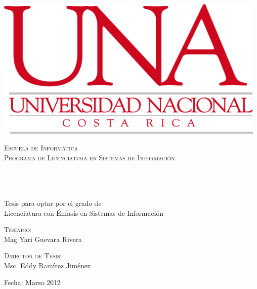 \begin{titlepage}
	\begin{center}
		\includegraphics[scale=0.5]{images/logoUNA.png}
	\end{center}
	\begin{center}	
	\textcolor{unablue}{%
		\textsc{\LARGE Escuela de Inform\'{a}tica}
		\\[0.2cm]
		\textsc{\large Programa de Licenciatura en Sistemas de
		Informaci\'{o}n}
		\\
	}
	\vfill
	 
		
	\HRule 
	\\[0.9cm]
	\doublespacing
	{
		\large
		\bfseries
		\thesistitle
	}
	\\[0.4cm]
	\singlespacing
	\HRule 
	\\[1.4cm]

	{
		\large Tesis para optar por el grado de 
		\\[0.6cm]
		Licenciatura con \'{E}nfasis en Sistemas de
		Informaci\'{o}n
	}
	\\
	\vfill
	 
	\begin{minipage}{0.45\textwidth}
		\begin{flushleft} 
			\large
			\textsc{Tesiario:}\\
			{Mag Yari Guevara Rivera}
		\end{flushleft}
	\end{minipage}
	\begin{minipage}{0.50\textwidth}
		\begin{flushright} 
			\large
			\textsc{Director de Tesis:}\\
			{Msc. Eddy Ram\'{i}rez Jim\'{e}nez}
		\end{flushright}
	\end{minipage}

	\vfill
	
	{
		\large Fecha: Marzo 2012
	}
	\end{center}
\end{titlepage}